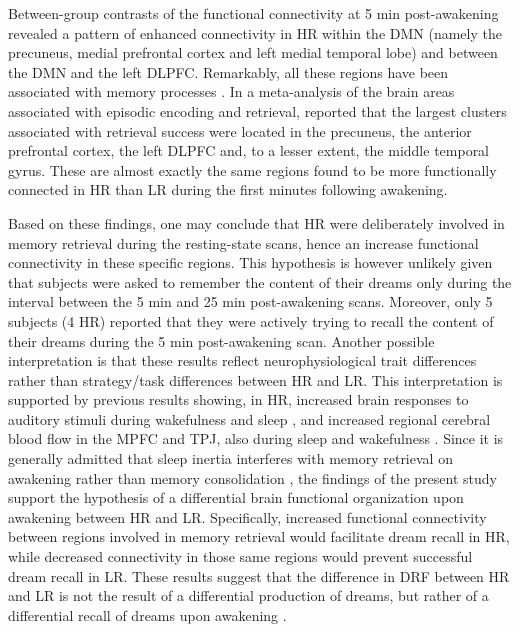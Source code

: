 Between-group contrasts of the functional connectivity at 5 min post-awakening revealed a pattern of enhanced connectivity in HR within the DMN (namely the precuneus, medial prefrontal cortex and left medial temporal lobe) and between the DMN and the left DLPFC. Remarkably, all these regions have been associated with memory processes . In a meta-analysis of the brain areas associated with episodic encoding and retrieval, \citet{spaniol_event-related_2009} reported that the largest clusters associated with retrieval success were located in the precuneus, the anterior prefrontal cortex, the left DLPFC and, to a lesser extent, the middle temporal gyrus. These are almost exactly the same regions found to be more functionally connected in HR than LR during the first minutes following awakening.

Based on these findings, one may conclude that HR were deliberately involved in memory retrieval during the resting-state scans, hence an increase functional connectivity in these specific regions. This hypothesis is however unlikely given that subjects were asked to remember the content of their dreams only during the interval between the 5 min and 25 min post-awakening scans. Moreover, only 5 subjects (4 HR) reported that they were actively trying to recall the content of their dreams during the 5 min post-awakening scan.  Another possible interpretation is that these results reflect neurophysiological trait differences rather than strategy/task differences between HR and LR. This interpretation is supported by previous results showing, in HR, increased brain responses to auditory stimuli during wakefulness and sleep \citep{eichenlaub_brain_2014}, and increased regional cerebral blood flow in the MPFC and TPJ, also during sleep and wakefulness \citep{eichenlaub_resting_2014}. Since it is generally admitted that sleep inertia interferes with memory retrieval on awakening rather than memory consolidation \citep{bonnet_memory_1983, dinges_are_1990, tassi_sleep_2000, conduit_poor_2004}, the findings of the present study support the hypothesis of a differential brain functional organization upon awakening between HR and LR.  Specifically, increased functional connectivity between regions involved in memory retrieval would facilitate dream recall in HR, while decreased connectivity in those same regions would prevent successful dream recall in LR. These results suggest that the difference in DRF between HR and LR is not the result of a differential production of dreams, but rather of a differential recall of dreams upon awakening .

